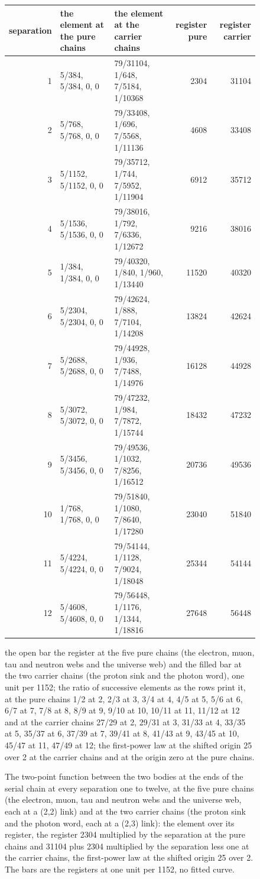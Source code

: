 \begin{figure}[htbp]
\scriptsize
\setlength{\tabcolsep}{3pt}
\begin{adjustbox}{max width=\linewidth}\begin{tabular}{rllrr}
separation & the element at the pure chains & the element at the carrier chains & register pure & register carrier \\ \hline
1 & 5/384, 5/384, 0, 0 & 79/31104, 1/648, 7/5184, 1/10368 & 2304 & 31104 \\
2 & 5/768, 5/768, 0, 0 & 79/33408, 1/696, 7/5568, 1/11136 & 4608 & 33408 \\
3 & 5/1152, 5/1152, 0, 0 & 79/35712, 1/744, 7/5952, 1/11904 & 6912 & 35712 \\
4 & 5/1536, 5/1536, 0, 0 & 79/38016, 1/792, 7/6336, 1/12672 & 9216 & 38016 \\
5 & 1/384, 1/384, 0, 0 & 79/40320, 1/840, 1/960, 1/13440 & 11520 & 40320 \\
6 & 5/2304, 5/2304, 0, 0 & 79/42624, 1/888, 7/7104, 1/14208 & 13824 & 42624 \\
7 & 5/2688, 5/2688, 0, 0 & 79/44928, 1/936, 7/7488, 1/14976 & 16128 & 44928 \\
8 & 5/3072, 5/3072, 0, 0 & 79/47232, 1/984, 7/7872, 1/15744 & 18432 & 47232 \\
9 & 5/3456, 5/3456, 0, 0 & 79/49536, 1/1032, 7/8256, 1/16512 & 20736 & 49536 \\
10 & 1/768, 1/768, 0, 0 & 79/51840, 1/1080, 7/8640, 1/17280 & 23040 & 51840 \\
11 & 5/4224, 5/4224, 0, 0 & 79/54144, 1/1128, 7/9024, 1/18048 & 25344 & 54144 \\
12 & 5/4608, 5/4608, 0, 0 & 79/56448, 1/1176, 1/1344, 1/18816 & 27648 & 56448 \\
\end{tabular}\end{adjustbox}

\scriptsize the open bar the register at the five pure chains (the electron, muon, tau and neutron webs and the universe web) and the filled bar at the two carrier chains (the proton sink and the photon word), one unit per 1152; the ratio of successive elements as the rows print it, at the pure chains 1/2 at 2, 2/3 at 3, 3/4 at 4, 4/5 at 5, 5/6 at 6, 6/7 at 7, 7/8 at 8, 8/9 at 9, 9/10 at 10, 10/11 at 11, 11/12 at 12 and at the carrier chains 27/29 at 2, 29/31 at 3, 31/33 at 4, 33/35 at 5, 35/37 at 6, 37/39 at 7, 39/41 at 8, 41/43 at 9, 43/45 at 10, 45/47 at 11, 47/49 at 12; the first-power law at the shifted origin 25 over 2 at the carrier chains and at the origin zero at the pure chains.
\caption{The two-point function between the two bodies at the ends of the serial chain at every separation one to twelve, at the five pure chains (the electron, muon, tau and neutron webs and the universe web, each at a (2,2) link) and at the two carrier chains (the proton sink and the photon word, each at a (2,3) link): the element over its register, the register 2304 multiplied by the separation at the pure chains and 31104 plus 2304 multiplied by the separation less one at the carrier chains, the first-power law at the shifted origin 25 over 2. The bars are the registers at one unit per 1152, no fitted curve.}\label{fig:V-11-D543290-two-point-function}
\end{figure}
